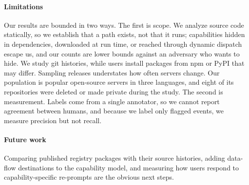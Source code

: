 \paragraph{Limitations}
Our results are bounded in two ways. The first is scope. We analyze source code statically, so we establish that a path exists, not that it runs; capabilities hidden in dependencies, downloaded at run time, or reached through dynamic dispatch escape us, and our counts are lower bounds against an adversary who wants to hide. We study git histories, while users install packages from npm or PyPI that may differ. Sampling releases understates how often servers change. Our population is popular open-source servers in three languages, and eight of its repositories were deleted or made private during the study. The second is measurement. Labels come from a single annotator, so we cannot report agreement between humans, and because we label only flagged events, we measure precision but not recall.

\paragraph{Future work}
Comparing published registry packages with their source histories, adding data-flow destinations to the capability model, and measuring how users respond to capability-specific re-prompts are the obvious next steps.
